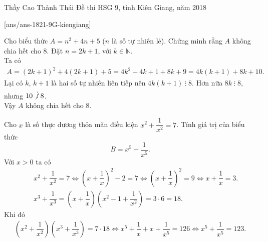 
\begin{name}
{Thầy  Cao Thành Thái}
{Đề thi HSG 9, tỉnh Kiên Giang, năm 2018}
\end{name}
\setcounter{ex}{0}
[ans/ans-1821-9G-kiengiang]

\begin{ex}%
 Cho biểu thức $A = n^2+4n+5$ ($n$ là số tự nhiên lẻ). Chứng minh rằng $A$ không chia hết cho $8$.
 \loigiai
  {
  Đặt $n = 2k + 1$, với $k \in \mathbb{N}$.\\
  Ta có
  \begin{eqnarray*}
   A = (2k+1)^2 + 4(2k+1) + 5 = 4k^2 + 4k + 1 + 8k + 9 = 4k(k+1)+ 8k + 10.
  \end{eqnarray*}
  Lại có $k$, $k+1$ là hai số tự nhiên liên tiếp nên $4k(k+1) \mathrel{\vdots} 8$. Hơn nữa $8k \mathrel{\vdots} 8$, nhưng $10 \mathrel{\not\vdots} 8$.\\
  Vậy $A$ không chia hết cho $8$.
  }
\end{ex}

\begin{ex}%
 Cho $x$ là số thực dương thỏa mãn điều kiện $x^2 + \dfrac{1}{x^2} = 7$. Tính giá trị của biểu thức $$B = x^5 + \dfrac{1}{x^5}.$$
 \loigiai
  {
  Với $x>0$ ta có
  \allowdisplaybreaks
  \begin{eqnarray*}
   & & x^2 + \dfrac{1}{x^2} = 7 \Leftrightarrow \left(x + \dfrac{1}{x}\right)^2 - 2 = 7 \Leftrightarrow \left(x + \dfrac{1}{x}\right)^2 = 9 \Leftrightarrow x + \dfrac{1}{x} = 3.\\
   & & x^3 + \dfrac{1}{x^3} = \left(x + \dfrac{1}{x}\right)\left(x^2 - 1 + \dfrac{1}{x^2}\right) = 3 \cdot 6 = 18.
  \end{eqnarray*}
  Khi đó
  \begin{eqnarray*}
   \left(x^2 + \dfrac{1}{x^2}\right)\left(x^3 + \dfrac{1}{x^3}\right) = 7 \cdot 18 \Leftrightarrow x^5 + \dfrac{1}{x} + x + \dfrac{1}{x^5} = 126 \Leftrightarrow x^5 + \dfrac{1}{x^5} = 123.
  \end{eqnarray*}
  }
\end{ex}

